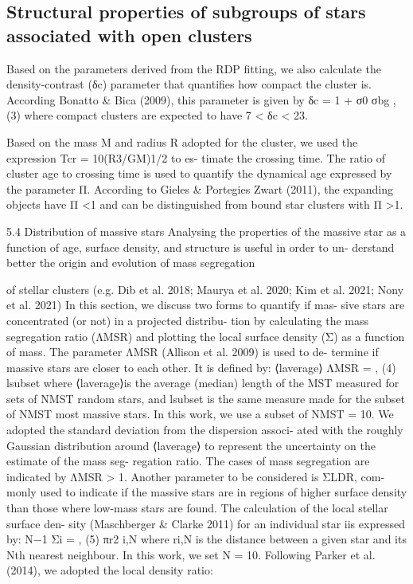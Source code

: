 \documentclass[../main.tex]{subfiles}
\begin{document}
{\subsection{Structural properties of subgroups of stars associated with open clusters}

Based on the parameters derived from the RDP fitting,
we also calculate the density-contrast (δc) parameter that
quantifies how compact the cluster is. According Bonatto &
Bica (2009), this parameter is given by
δc = 1 + σ0
σbg
, (3)
where compact clusters are expected to have 7 < δc < 23.

Based on the mass M and radius R adopted for the
cluster, we used the expression Tcr = 10(R3/GM)1/2 to es-
timate the crossing time. The ratio of cluster age to crossing
time is used to quantify the dynamical age expressed by the
parameter Π. According to Gieles & Portegies Zwart (2011),
the expanding objects have Π <1 and can be distinguished
from bound star clusters with Π >1.

5.4 Distribution of massive stars
Analysing the properties of the massive star as a function of
age, surface density, and structure is useful in order to un-
derstand better the origin and evolution of mass segregation

of stellar clusters (e.g. Dib et al. 2018; Maurya et al. 2020;
Kim et al. 2021; Nony et al. 2021)
In this section, we discuss two forms to quantify if mas-
sive stars are concentrated (or not) in a projected distribu-
tion by calculating the mass segregation ratio (ΛMSR) and
plotting the local surface density (Σ) as a function of mass.
The parameter ΛMSR (Allison et al. 2009) is used to de-
termine if massive stars are closer to each other. It is defined
by:
⟨laverage⟩
ΛMSR =
, (4)
lsubset
where ⟨laverage⟩is the average (median) length of the MST
measured for sets of NMST random stars, and lsubset is the
same measure made for the subset of NMST most massive
stars. In this work, we use a subset of NMST = 10. We
adopted the standard deviation from the dispersion associ-
ated with the roughly Gaussian distribution around ⟨laverage⟩
to represent the uncertainty on the estimate of the mass seg-
regation ratio. The cases of mass segregation are indicated
by ΛMSR > 1.
Another parameter to be considered is ΣLDR, com-
monly used to indicate if the massive stars are in regions
of higher surface density than those where low-mass stars
are found. The calculation of the local stellar surface den-
sity (Maschberger & Clarke 2011) for an individual star iis
expressed by:
N−1
Σi =
, (5)
πr2
i,N
where ri,N is the distance between a given star and its Nth
nearest neighbour. In this work, we set N = 10. Following
Parker et al. (2014), we adopted the local density ratio:

}
\end{document}
